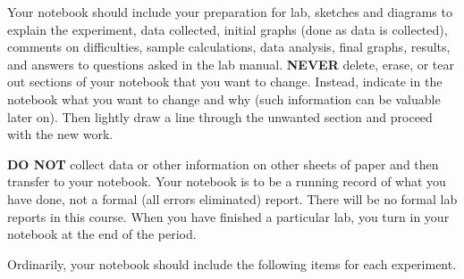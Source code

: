      Your notebook should include your preparation for lab,
sketches and diagrams to explain the experiment, data collected,
initial graphs (done as data is collected), comments on
difficulties, sample calculations, data analysis, final graphs,
results, and answers to questions asked in the lab manual.  {\bf
NEVER} delete, erase, or tear out sections of your notebook that
you want to change.  Instead, indicate in the notebook what you
want to change and why (such information can be valuable later on).
Then lightly draw a line through the unwanted section and proceed with
the new work.

{\bf DO NOT} collect data or other information on other sheets
of paper and then transfer to your notebook.  Your notebook
is to be a running record of what you have done, not a formal
(all errors eliminated) report.  There will be no formal lab
reports in this course.  When you have finished a particular lab, you turn in
your notebook at the end of the period.

Ordinarily, your notebook should include the following items for each
experiment.

